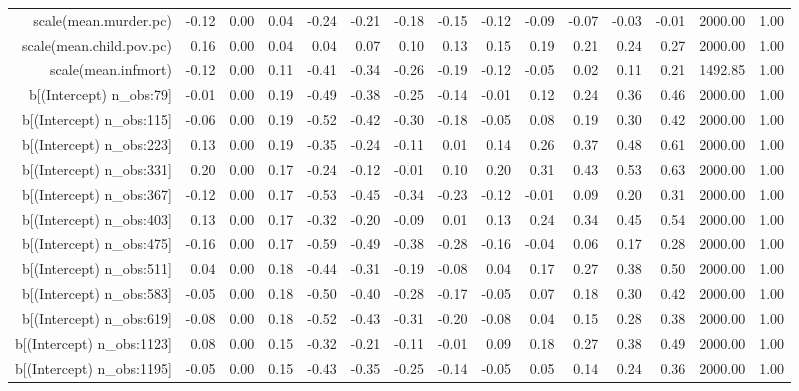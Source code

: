\begin{table}[ht]
\begin{tabular}{rrrrrrrrrrrrrrr}
  scale(mean.murder.pc) & -0.12 & 0.00 & 0.04 & -0.24 & -0.21 & -0.18 & -0.15 & -0.12 & -0.09 & -0.07 & -0.03 & -0.01 & 2000.00 & 1.00 \\ 
  scale(mean.child.pov.pc) & 0.16 & 0.00 & 0.04 & 0.04 & 0.07 & 0.10 & 0.13 & 0.15 & 0.19 & 0.21 & 0.24 & 0.27 & 2000.00 & 1.00 \\ 
  scale(mean.infmort) & -0.12 & 0.00 & 0.11 & -0.41 & -0.34 & -0.26 & -0.19 & -0.12 & -0.05 & 0.02 & 0.11 & 0.21 & 1492.85 & 1.00 \\ 
  b[(Intercept) n\_obs:79] & -0.01 & 0.00 & 0.19 & -0.49 & -0.38 & -0.25 & -0.14 & -0.01 & 0.12 & 0.24 & 0.36 & 0.46 & 2000.00 & 1.00 \\ 
  b[(Intercept) n\_obs:115] & -0.06 & 0.00 & 0.19 & -0.52 & -0.42 & -0.30 & -0.18 & -0.05 & 0.08 & 0.19 & 0.30 & 0.42 & 2000.00 & 1.00 \\ 
  b[(Intercept) n\_obs:223] & 0.13 & 0.00 & 0.19 & -0.35 & -0.24 & -0.11 & 0.01 & 0.14 & 0.26 & 0.37 & 0.48 & 0.61 & 2000.00 & 1.00 \\ 
  b[(Intercept) n\_obs:331] & 0.20 & 0.00 & 0.17 & -0.24 & -0.12 & -0.01 & 0.10 & 0.20 & 0.31 & 0.43 & 0.53 & 0.63 & 2000.00 & 1.00 \\ 
  b[(Intercept) n\_obs:367] & -0.12 & 0.00 & 0.17 & -0.53 & -0.45 & -0.34 & -0.23 & -0.12 & -0.01 & 0.09 & 0.20 & 0.31 & 2000.00 & 1.00 \\ 
  b[(Intercept) n\_obs:403] & 0.13 & 0.00 & 0.17 & -0.32 & -0.20 & -0.09 & 0.01 & 0.13 & 0.24 & 0.34 & 0.45 & 0.54 & 2000.00 & 1.00 \\ 
  b[(Intercept) n\_obs:475] & -0.16 & 0.00 & 0.17 & -0.59 & -0.49 & -0.38 & -0.28 & -0.16 & -0.04 & 0.06 & 0.17 & 0.28 & 2000.00 & 1.00 \\ 
  b[(Intercept) n\_obs:511] & 0.04 & 0.00 & 0.18 & -0.44 & -0.31 & -0.19 & -0.08 & 0.04 & 0.17 & 0.27 & 0.38 & 0.50 & 2000.00 & 1.00 \\ 
  b[(Intercept) n\_obs:583] & -0.05 & 0.00 & 0.18 & -0.50 & -0.40 & -0.28 & -0.17 & -0.05 & 0.07 & 0.18 & 0.30 & 0.42 & 2000.00 & 1.00 \\ 
  b[(Intercept) n\_obs:619] & -0.08 & 0.00 & 0.18 & -0.52 & -0.43 & -0.31 & -0.20 & -0.08 & 0.04 & 0.15 & 0.28 & 0.38 & 2000.00 & 1.00 \\ 
  b[(Intercept) n\_obs:1123] & 0.08 & 0.00 & 0.15 & -0.32 & -0.21 & -0.11 & -0.01 & 0.09 & 0.18 & 0.27 & 0.38 & 0.49 & 2000.00 & 1.00 \\ 
  b[(Intercept) n\_obs:1195] & -0.05 & 0.00 & 0.15 & -0.43 & -0.35 & -0.25 & -0.14 & -0.05 & 0.05 & 0.14 & 0.24 & 0.36 & 2000.00 & 1.00 \\ 

\end{tabular}
\end{table}

